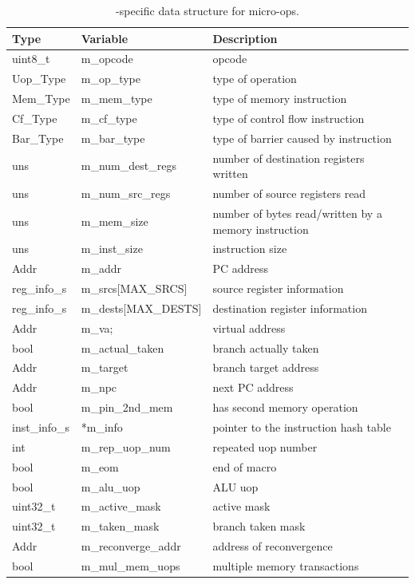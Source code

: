 \begin{table}[!htb]
\begin{footnotesize}
\begin{center}
\caption{\SIM-specific data structure for micro-ops.}
\label{table:trace_uops}
\begin{tabular}{|l|l|l|} 
\hline
Type      & Variable                 & Description \\ \hline \hline
uint8\_t  & m\_opcode                & opcode \\ \hline
Uop\_Type & m\_op\_type              & type of operation \\ \hline
Mem\_Type & m\_mem\_type             & type of memory instruction \\ \hline
Cf\_Type  & m\_cf\_type              & type of control flow instruction \\ \hline
Bar\_Type & m\_bar\_type             & type of barrier caused by instruction \\ \hline
uns       &   m\_num\_dest\_regs     & number of destination registers written \\ \hline
uns       &   m\_num\_src\_regs      & number of source registers read \\ \hline
uns       &   m\_mem\_size           & number of bytes read/written by a memory instruction \\ \hline
uns       &   m\_inst\_size          & instruction size \\ \hline
Addr      &   m\_addr                & PC address  \\ \hline
reg\_info\_s&   m\_srcs[MAX\_SRCS]   & source register information \\ \hline
reg\_info\_s&   m\_dests[MAX\_DESTS] & destination register information \\ \hline
Addr      &   m\_va;                 & virtual address \\ \hline
bool      &   m\_actual\_taken       & branch actually taken \\ \hline
Addr      &   m\_target              & branch target address \\ \hline
Addr      &   m\_npc                 & next PC address  \\ \hline
bool      &   m\_pin\_2nd\_mem       & has second memory operation \\ \hline
inst\_info\_s& *m\_info              & pointer to the instruction hash table  \\ \hline
int       &   m\_rep\_uop\_num       & repeated uop number \\ \hline
bool      &   m\_eom                 & end of macro \\ \hline
bool      &   m\_alu\_uop            & ALU uop  \\ \hline
uint32\_t  &   m\_active\_mask       & active mask \\ \hline
uint32\_t  &   m\_taken\_mask        & branch taken mask \\ \hline
Addr      &   m\_reconverge\_addr    & address of reconvergence \\ \hline
bool      &   m\_mul\_mem\_uops      & multiple memory transactions \\ \hline


\end{tabular}
\end{center}
\end{footnotesize}
\end{table}

